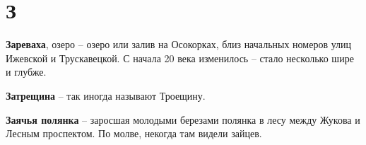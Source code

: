 \chapter*{З}

\textbf{Зареваха}, озеро – озеро или залив на Осокорках, близ начальных номеров улиц Ижевской и Трускавецкой. С начала 20 века изменилось – стало несколько шире и глубже.\\

\medskip





\textbf{Затрещина} – так иногда называют Троещину.\\

\medskip


\textbf{Заячья полянка} – заросшая молодыми березами полянка в лесу между Жукова и Лесным проспектом. По молве, некогда там видели зайцев.
